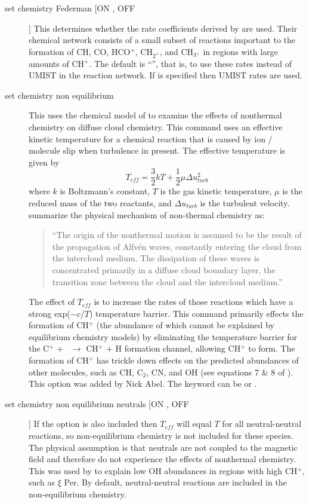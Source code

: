 \begin{description}
\item[set chemistry Federman  [ON , OFF]]  This determines whether the rate
coefficients derived by \citet{Zsargo2003} are used.
Their
chemical network consists of a small subset of reactions important to the
formation of CH, CO, HCO$^+$, CH$_{2^{+}}$, and CH$_{3{^+}}$ in regions with large amounts
of CH$^+$.
The default is ``'', that is, to use these rates instead of UMIST
in the reaction network.
If  is specified then UMIST rates are used.

\item[set chemistry non equilibrium] This uses the chemical model of \citet{Federman1996} to examine the effects of nonthermal chemistry on diffuse
cloud chemistry.
This command uses an effective kinetic temperature for
a chemical reaction that is caused by ion / molecule slip
when turbulence in present.
The effective temperature is given by
\begin{equation}
T_{eff}  = \frac{3}{2}kT + \frac{1}{2}\mu \Delta u_{turb}^2
\end{equation}
where $k$ is Boltzmann's constant, $T$ is the gas kinetic temperature, $\mu$ is
the reduced mass of the two reactants, and $\Delta u_{turb}$ is the turbulent velocity.
\citet{Zsargo2003} summarize the physical mechanism of
non-thermal chemistry as:
\begin{quote}
``The origin of the nonthermal motion is assumed to be the result of
the propagation of Alfv\'en waves, constantly entering the cloud from the
intercloud medium.
The dissipation of these waves is concentrated primarily
in a diffuse cloud boundary layer,
the transition zone between the cloud
and the intercloud medium.''
\end{quote}
   The effect of $T_{eff}$ is to increase the rates of those reactions which
have a strong exp($-c/T$) temperature barrier.
This command primarily effects
the formation of CH$^+$ (the abundance of which cannot be explained by
equilibrium chemistry models) by eliminating the temperature barrier for
the C$^+$ + \htwo\ $\to$ CH$^+$ + H formation channel, allowing CH$^+$ to form.
The formation of CH$^+$ has trickle down effects on the predicted abundances
of other molecules,
such as CH, C$_2$, CN, and OH (see equations 7 \& 8 of
\citealp{Zsargo2003}).
This option was added by Nick Abel.
The keyword can
be  or .

\item[set chemistry non equilibrium neutrals [ON , OFF]]    If the option
 is also included then $T_{eff}$ will equal $T$ for all neutral-neutral
reactions, so non-equilibrium chemistry is not included for these species.
The physical assumption is that neutrals are not coupled to the magnetic
field and therefore do not experience the effects of nonthermal chemistry.
This was used by \citet{Federman1996} to explain low OH abundances in
regions with high CH$^+$, such as $\xi$ Per.
By default, neutral-neutral reactions
are included in the non-equilibrium chemistry.


\end{description}
